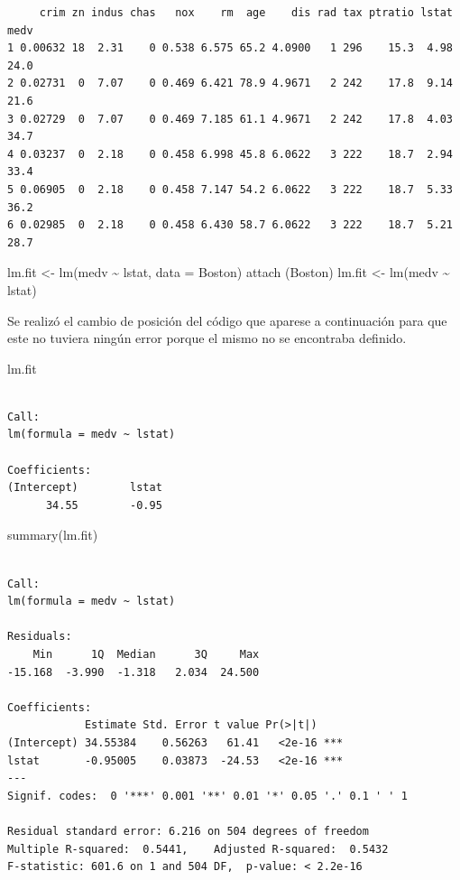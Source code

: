 \documentclass[
  letterpaper,
  DIV=11,
  numbers=noendperiod]{scrartcl}
\newenvironment{Shaded}{\begin{snugshade}}{\end{snugshade}}
\newcommand{\AttributeTok}[1]{\textcolor[rgb]{0.40,0.45,0.13}{#1}}
\newcommand{\FunctionTok}[1]{\textcolor[rgb]{0.28,0.35,0.67}{#1}}
\newcommand{\NormalTok}[1]{\textcolor[rgb]{0.00,0.23,0.31}{#1}}
\newcommand{\OtherTok}[1]{\textcolor[rgb]{0.00,0.23,0.31}{#1}}
\newcommand{\SpecialCharTok}[1]{\textcolor[rgb]{0.37,0.37,0.37}{#1}}
\begin{document}
\begin{verbatim}
     crim zn indus chas   nox    rm  age    dis rad tax ptratio lstat medv
1 0.00632 18  2.31    0 0.538 6.575 65.2 4.0900   1 296    15.3  4.98 24.0
2 0.02731  0  7.07    0 0.469 6.421 78.9 4.9671   2 242    17.8  9.14 21.6
3 0.02729  0  7.07    0 0.469 7.185 61.1 4.9671   2 242    17.8  4.03 34.7
4 0.03237  0  2.18    0 0.458 6.998 45.8 6.0622   3 222    18.7  2.94 33.4
5 0.06905  0  2.18    0 0.458 7.147 54.2 6.0622   3 222    18.7  5.33 36.2
6 0.02985  0  2.18    0 0.458 6.430 58.7 6.0622   3 222    18.7  5.21 28.7
\end{verbatim}

\begin{Shaded}
\begin{Highlighting}[]
\NormalTok{lm.fit }\OtherTok{\textless{}{-}} \FunctionTok{lm}\NormalTok{(medv }\SpecialCharTok{\textasciitilde{}}\NormalTok{ lstat, }\AttributeTok{data =}\NormalTok{ Boston)}
\FunctionTok{attach}\NormalTok{ (Boston)}
\NormalTok{lm.fit }\OtherTok{\textless{}{-}} \FunctionTok{lm}\NormalTok{(medv }\SpecialCharTok{\textasciitilde{}}\NormalTok{ lstat)}
\end{Highlighting}
\end{Shaded}

Se realizó el cambio de posición del código que aparese a continuación
para que este no tuviera ningún error porque el mismo no se encontraba
definido.

\begin{Shaded}
\begin{Highlighting}[]
\NormalTok{lm.fit }
\end{Highlighting}
\end{Shaded}

\begin{verbatim}

Call:
lm(formula = medv ~ lstat)

Coefficients:
(Intercept)        lstat  
      34.55        -0.95  
\end{verbatim}

\begin{Shaded}
\begin{Highlighting}[]
\FunctionTok{summary}\NormalTok{(lm.fit)}
\end{Highlighting}
\end{Shaded}

\begin{verbatim}

Call:
lm(formula = medv ~ lstat)

Residuals:
    Min      1Q  Median      3Q     Max 
-15.168  -3.990  -1.318   2.034  24.500 

Coefficients:
            Estimate Std. Error t value Pr(>|t|)    
(Intercept) 34.55384    0.56263   61.41   <2e-16 ***
lstat       -0.95005    0.03873  -24.53   <2e-16 ***
---
Signif. codes:  0 '***' 0.001 '**' 0.01 '*' 0.05 '.' 0.1 ' ' 1

Residual standard error: 6.216 on 504 degrees of freedom
Multiple R-squared:  0.5441,    Adjusted R-squared:  0.5432 
F-statistic: 601.6 on 1 and 504 DF,  p-value: < 2.2e-16
\end{verbatim}
\end{document}
